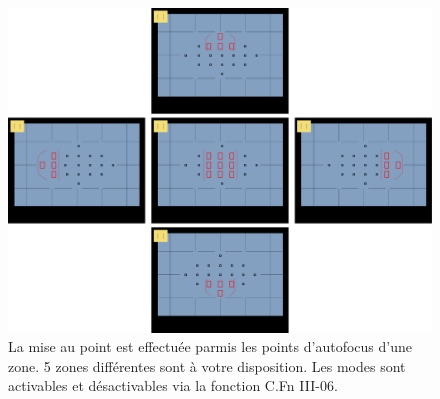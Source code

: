 \documentclass[a4paper,twoside]{article}
\begin{document}

% 
% 

\begin{figure}[htb]
\centering
\includegraphics[width=\linewidth]{figure/AF_points_zone.pdf}
\caption{La mise au point est effectuée parmis les points d'autofocus d'une zone. 5 zones différentes sont à votre disposition. Les modes sont activables et désactivables via la fonction C.Fn III-06.}\label{fig:AF_points_zone}
\end{figure}
\end{document}
